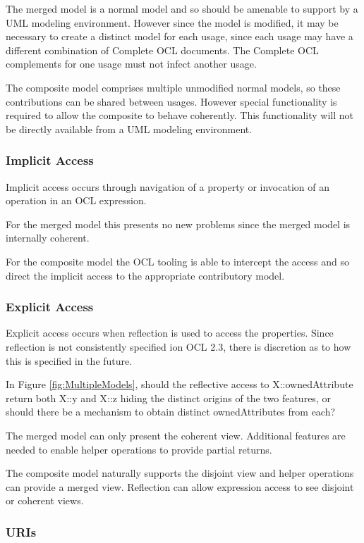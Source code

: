 \documentclass{eceasst}
\begin{document}
The merged model is a normal model and so should be amenable to support by a UML modeling environment. However since the model is modified, it may be necessary to create a distinct model for each usage, since each usage may have a different combination of Complete OCL documents. The Complete OCL complements for one usage must not infect another usage.

The composite model comprises multiple unmodified normal models, so these contributions can be shared between usages. However special functionality is required to allow the composite to behave coherently. This functionality will not be directly available from a UML modeling environment.

\subsubsection{Implicit Access}

Implicit access occurs through navigation of a property or invocation of an operation in an OCL expression.

For the merged model this presents no new problems since the merged model is internally coherent.

For the composite model the OCL tooling is able to intercept the access and so direct the implicit access to the appropriate contributory model.

\subsubsection{Explicit Access}

Explicit access occurs when reflection is used to access the properties. Since reflection is not consistently specified ion OCL 2.3, there is discretion as to how this is specified in the future.

In Figure \ref{fig:MultipleModels}, should the reflective access to X::ownedAttribute return both X::y and X::z hiding the distinct origins of the two features, or should there be a mechanism to obtain distinct ownedAttributes from each?

The merged model can only present the coherent view. Additional features are needed to enable helper operations to provide partial returns.

The composite model naturally supports the disjoint view and helper operations can provide a merged view. Reflection can allow expression access to see disjoint or coherent views.

\subsubsection{URIs}
\end{document}

